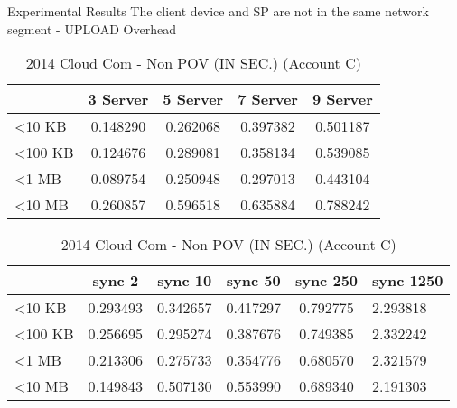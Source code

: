 \begin{frame}{Experimental Results}
{The client device and SP are \alert{not} in the same network segment - UPLOAD Overhead}
	\scriptsize
    \begin{table}[]
    \centering
    \caption{My Method - Non POV (IN SEC.) (Account C)}
    \begin{tabular}{lcccc}
                         & 3 Server & 5 Server & 7 Server & 9 Server \\ \hline
        \textless 10 KB  & 0.148290 & 0.262068 & 0.397382 & 0.501187 \\ \hline
        \textless 100 KB & 0.124676 & 0.289081 & 0.358134 & 0.539085 \\ \hline
        \textless 1 MB   & 0.089754 & 0.250948 & 0.297013 & 0.443104 \\ \hline
        \textless 10 MB  & 0.260857 & 0.596518 & 0.635884 & 0.788242 \\ \hline
    \end{tabular}
    \caption{2014 Cloud Com - Non POV (IN SEC.) (Account C)}
    \begin{tabular}{lccccl}
                         & sync 2   & sync 10  & sync 50  & sync 250 & sync 1250 \\ \hline
        \textless 10 KB  & 0.293493 & 0.342657 & 0.417297 & 0.792775 & 2.293818  \\ \hline
        \textless 100 KB & 0.256695 & 0.295274 & 0.387676 & 0.749385 & 2.332242  \\ \hline
        \textless 1 MB   & 0.213306 & 0.275733 & 0.354776 & 0.680570 & 2.321579  \\ \hline
        \textless 10 MB  & 0.149843 & 0.507130 & 0.553990 & 0.689340 & 2.191303  \\ \hline
    \end{tabular}
    \end{table}
\end{frame}

